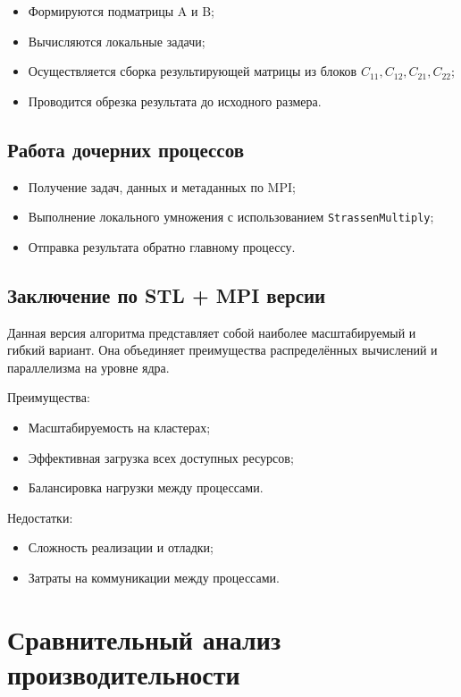 \documentclass[14pt,a4paper]{extarticle}
\begin{document}
\begin{itemize}
  \item Формируются подматрицы A и B;
  \item Вычисляются локальные задачи;
  \item Осуществляется сборка результирующей матрицы из блоков $C_{11}, C_{12}, C_{21}, C_{22}$;
  \item Проводится обрезка результата до исходного размера.
\end{itemize}

\subsection*{Работа дочерних процессов}

\begin{itemize}
  \item Получение задач, данных и метаданных по MPI;
  \item Выполнение локального умножения с использованием \texttt{StrassenMultiply};
  \item Отправка результата обратно главному процессу.
\end{itemize}

\subsection*{Заключение по STL + MPI версии}

Данная версия алгоритма представляет собой наиболее масштабируемый и гибкий вариант. Она объединяет преимущества распределённых вычислений и параллелизма на уровне ядра.

Преимущества:
\begin{itemize}
    \item Масштабируемость на кластерах;
    \item Эффективная загрузка всех доступных ресурсов;
    \item Балансировка нагрузки между процессами.
\end{itemize}

Недостатки:
\begin{itemize}
    \item Сложность реализации и отладки;
    \item Затраты на коммуникации между процессами.
\end{itemize}

\newpage
\section{Сравнительный анализ производительности}
\end{document}
